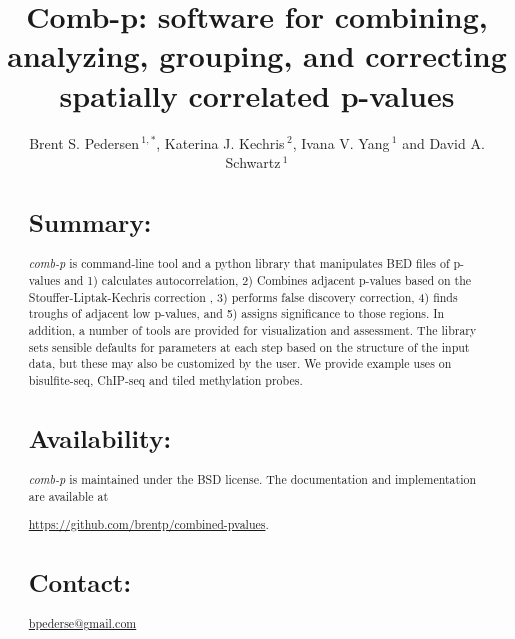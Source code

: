 \documentclass{bioinfo}
\begin{document}

\title[comb-p]{Comb-p: software for combining, analyzing, grouping, and correcting spatially correlated p-values}
\author[Pedersen \textit{et~al}]{Brent S. Pedersen\,$^{1,*}$, Katerina J. Kechris\,$^{2}$,
    Ivana V. Yang\,$^{1}$ and David A. Schwartz\,$^1$}
\address{$^{1}$Department of Medicine, University of Colorado, Denver, Anschutz Medical Campus, Aurora CO 80045, USA\\
$^{2}$Department of Statistics, University of Colorado, Denver, Anschutz Medical Campus, Aurora CO 80045, USA\\
}
\maketitle
\begin{abstract}

\section{Summary:}
\textit{comb-p} is command-line tool and a python library that
manipulates BED files of p-values and 1) calculates autocorrelation, 2) Combines
adjacent p-values based on the Stouffer-Liptak-Kechris correction \citep{Kechris2010},
3) performs false discovery correction, 4) finds troughs of adjacent low p-values,
and 5) assigns significance to those regions.
In addition, a number of tools are provided for visualization and
assessment. The library sets sensible defaults for parameters at each
step based on the structure of the input data, but these may also be customized
by the user. We provide example uses on bisulfite-seq, ChIP-seq and tiled methylation
probes.

\section{Availability:}
\textit{comb-p} is maintained under the BSD license. The documentation and
implementation are available at

\href{https://github.com/brentp/combined-pvalues}{https://github.com/brentp/combined-pvalues}.
\section{Contact:} \href{bpederse@gmail.com}{bpederse@gmail.com}
\end{abstract}
\end{document}

